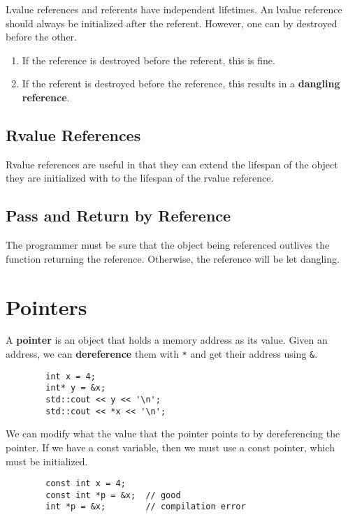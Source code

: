 \documentclass{article}
\begin{document}
    \begin{lemma} 
      Lvalue references and referents have independent lifetimes. An lvalue reference should always be initialized after the referent. However, one can by destroyed before the other. 
      \begin{enumerate}
        \item If the reference is destroyed before the referent, this is fine. 
        \item If the referent is destroyed before the reference, this results in a \textbf{dangling reference}. 
      \end{enumerate}
    \end{lemma}

  \subsection{Rvalue References}

    Rvalue references are useful in that they can extend the lifespan of the object they are initialized with to the lifespan of the rvalue reference. 

    \begin{definition}
      
    \end{definition}

  \subsection{Pass and Return by Reference}

    \begin{theorem}
      The programmer must be sure that the object being referenced outlives the function returning the reference. Otherwise, the reference will be let dangling. 
    \end{theorem}

\section{Pointers} 

    \begin{definition}[Pointer]
      A \textbf{pointer} is an object that holds a memory address as its value. Given an address, we can \textbf{dereference} them with \texttt{*} and get their address using \texttt{\&}. 
      \begin{lstlisting}
        int x = 4; 
        int* y = &x; 
        std::cout << y << '\n'; 
        std::cout << *x << '\n'; 
      \end{lstlisting} 
      We can modify what the value that the pointer points to by dereferencing the pointer. If we have a const variable, then we must use a const pointer, which must be initialized. 
      \begin{lstlisting}
        const int x = 4;  
        const int *p = &x;  // good
        int *p = &x;        // compilation error
      \end{lstlisting}
    \end{definition} 
\end{document}
